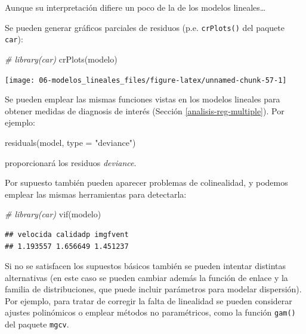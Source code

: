 \documentclass[
  spanish,
]{book}
\newenvironment{Shaded}{\begin{snugshade}}{\end{snugshade}}
\newcommand{\AttributeTok}[1]{\textcolor[rgb]{0.77,0.63,0.00}{#1}}
\newcommand{\CommentTok}[1]{\textcolor[rgb]{0.56,0.35,0.01}{\textit{#1}}}
\newcommand{\FunctionTok}[1]{\textcolor[rgb]{0.00,0.00,0.00}{#1}}
\newcommand{\NormalTok}[1]{#1}
\newcommand{\StringTok}[1]{\textcolor[rgb]{0.31,0.60,0.02}{#1}}
\theoremstyle{break}
\theoremstyle{definition}
\theoremstyle{definition}
\theoremstyle{definition}
\theoremstyle{definition}
\theoremstyle{remark}
\begin{document}
Aunque su interpretación difiere un poco de la de los modelos lineales\ldots{}

Se pueden generar gráficos parciales de residuos (p.e. \texttt{crPlots()} del paquete \texttt{car}):

\begin{Shaded}
\begin{Highlighting}[]
\CommentTok{\# library(car)}
\FunctionTok{crPlots}\NormalTok{(modelo)}
\end{Highlighting}
\end{Shaded}

\begin{center}\texttt{[image: 06-modelos\_lineales\_files/figure-latex/unnamed-chunk-57-1]} \end{center}

Se pueden emplear las mismas funciones vistas en los modelos lineales para obtener medidas de diagnosis de interés (Sección \ref{analisis-reg-multiple}). Por ejemplo:

\begin{Shaded}
\begin{Highlighting}[]
\FunctionTok{residuals}\NormalTok{(model, }\AttributeTok{type =} \StringTok{"deviance"}\NormalTok{)}
\end{Highlighting}
\end{Shaded}

proporcionará los residuos \emph{deviance}.

Por supuesto también pueden aparecer problemas de colinealidad, y podemos emplear las mismas herramientas para detectarla:

\begin{Shaded}
\begin{Highlighting}[]
\CommentTok{\# library(car)}
\FunctionTok{vif}\NormalTok{(modelo)}
\end{Highlighting}
\end{Shaded}

\begin{verbatim}
## velocida calidadp imgfvent 
## 1.193557 1.656649 1.451237
\end{verbatim}

Si no se satisfacen los supuestos básicos también se pueden intentar distintas alternativas (en este caso se pueden cambiar además la función de enlace y la familia de distribuciones, que puede incluir parámetros para modelar dispersión).
Por ejemplo, para tratar de corregir la falta de linealidad se pueden considerar ajustes polinómicos o emplear métodos no paramétricos, como la función \texttt{gam()} del paquete \texttt{mgcv}.
\end{document}
